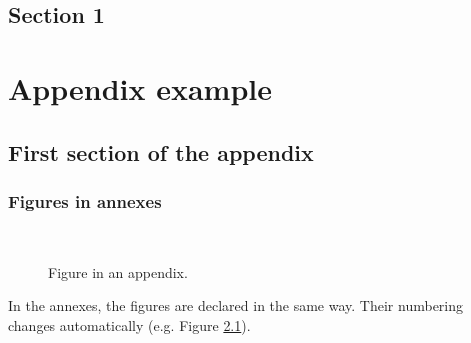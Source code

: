 \documentclass[letterpaper%
, twoside%
, 12pt%
,these%
, english%
,creativecommons,hyperref%
]{thETS}
\begin{document}
\section{Section 1}

\lipsum[1] %

\begin{conclusion}

  \lipsum[1] %

\end{conclusion}


\appendix

\multiannexe

% 

\chapter{Appendix example}


\section{First section of the appendix}


\subsection{Figures in annexes}

\begin{figure}
  \centering
  \\ \parbox{0.75\textwidth}{\caption{Figure in an appendix.}\label{fig:testAp}}
\end{figure}

In the annexes, the figures are declared in the same way. Their numbering changes automatically (e.g. Figure \ref{fig:testAp}).
\end{document}
